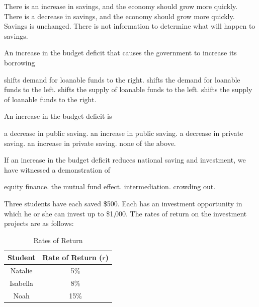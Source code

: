 \documentclass[addpoints,11pt]{exam}
\theoremstyle{definition}
\begin{document}
\begin{questions}
\begin{choices}
	\choice There is an increase in savings, and the economy should grow more quickly.
	\choice There is a decrease in savings, and the economy should grow more quickly.
	\CorrectChoice Savings is unchanged.
	\choice There is not information to determine what will happen to savings.
\end{choices}

\question An increase in the budget deficit that causes the government to increase its borrowing

\begin{choices}
	\choice shifts demand for loanable funds to the right.
	\choice shifts the demand for loanable funds to the left.
	\CorrectChoice shifts the supply of loanable funds to the left.
	\choice shifts the supply of loanable funds to the right.
\end{choices}

\question An increase in the budget deficit is

\begin{choices}
	\CorrectChoice a decrease in public saving.
	\choice an increase in public saving.
	\choice a decrease in private saving.
	\choice an increase in private saving.
	\choice none of the above.
\end{choices}

\question If an increase in the budget deficit reduces national saving and investment, we have witnessed a demonstration of 

\begin{choices}
	\choice equity finance.
	\choice the mutual fund effect.
	\choice intermediation.
	\CorrectChoice crowding out.
\end{choices}

	\question Three students have each saved \$500. Each has an investment opportunity in which he or she can invest up to \$1,000. The rates of return on the investment projects are as follows:
	
	
	\begin{table}[H]
		\caption{Rates of Return}
		\label{tab1}
		\centering
		\begin{tabular}{  c|c}        
			
			Student   & Rate of Return ($r$) \\
			\hline
			Natalie & 5\% \\
			Isabella & 8\% \\
			Noah & 15\% \\
		\end{tabular}
	\end{table}
	

\end{questions}
\end{document}
